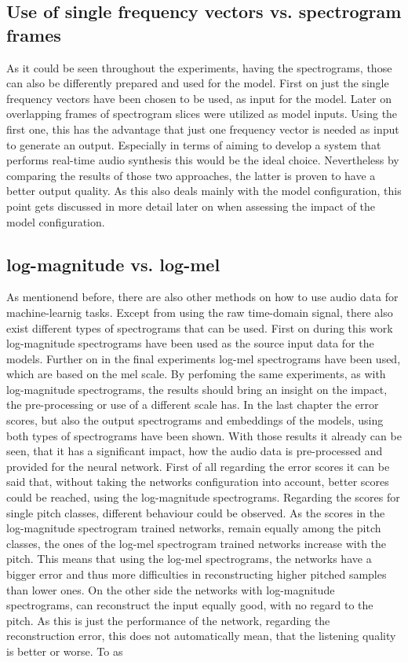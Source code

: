 \subsection{Use of single frequency vectors vs. spectrogram frames}
As it could be seen throughout the experiments, having the spectrograms, those can also be differently prepared and used for the model. First on just the single frequency vectors have been chosen to be used, as input for the model. Later on overlapping frames of spectrogram slices were utilized as model inputs. Using the first one, this has the advantage that just one frequency vector is needed as input to generate an output. Especially in terms of aiming to develop a system that performs real-time audio synthesis this would be the ideal choice. Nevertheless by comparing the results of those two approaches, the latter is proven to have a better output quality. As this also deals mainly with the model configuration, this point gets discussed in more detail later on when assessing the impact of the model configuration. 

\subsection{log-magnitude vs. log-mel}
As mentionend before, there are also other methods on how to use audio data for machine-learnig tasks. Except from using the raw time-domain signal, there also exist different types of spectrograms that can be used. First on during this work log-magnitude spectrograms have been used as the source input data for the models. Further on in the final experiments log-mel spectrograms have been used, which are based on the mel scale. By perfoming the same experiments, as with log-magnitude spectrograms, the results should bring an insight on the impact, the pre-processing or use of a different scale has. In the last chapter the error scores, but also the output spectrograms and embeddings of the models, using both types of spectrograms have been shown. With those results it already can be seen, that it has a significant impact, how the audio data is pre-processed and provided for the neural network. First of all regarding the error scores it can be said that, without taking the networks configuration into account, better scores could be reached, using the log-magnitude spectrograms. Regarding the scores for single pitch classes, different behaviour could be observed. As the scores in the log-magnitude spectrogram trained networks, remain equally among the pitch classes, the ones of the log-mel spectrogram trained networks increase with the pitch. This means that using the log-mel spectrograms, the networks have a bigger error and thus more difficulties in reconstructing higher pitched samples than lower ones. On the other side the networks with log-magnitude spectrograms, can reconstruct the input equally good, with no regard to the pitch. As this is just the performance of the network, regarding the reconstruction error, this does not automatically mean, that the listening quality is better or worse. To as



